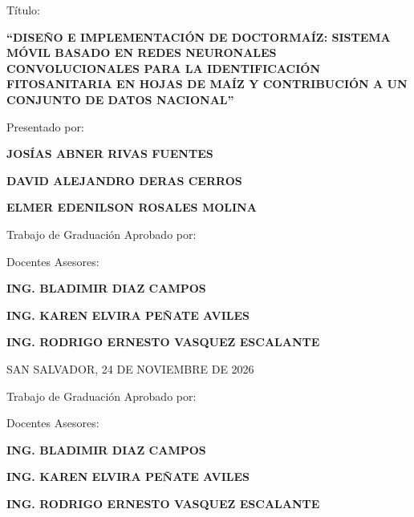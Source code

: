 \documentclass[12pt,letterpaper]{report}
\begin{document}
\noindent \small T\'itulo:
\begin{center}
{\normalsize\bfseries ``DISE\~NO E IMPLEMENTACI\'ON DE DOCTORMA\'IZ: SISTEMA M\'OVIL BASADO EN REDES NEURONALES CONVOLUCIONALES PARA LA IDENTIFICACI\'ON FITOSANITARIA EN HOJAS DE MA\'IZ Y CONTRIBUCI\'ON A UN CONJUNTO DE DATOS NACIONAL''\par}
\end{center}
\vspace{0.4cm}

\noindent \small Presentado por:
\begin{center}
{\normalsize\bfseries JOS\'IAS ABNER RIVAS FUENTES\par}
\vspace{0.15cm}
{\normalsize\bfseries DAVID ALEJANDRO DERAS CERROS\par}
\vspace{0.15cm}
{\normalsize\bfseries ELMER EDENILSON ROSALES MOLINA\par}
\end{center}
\vspace{0.4cm}

\noindent \small Trabajo de Graduaci\'on Aprobado por:\par
\vspace{0.25cm}
\noindent \small \hspace*{0.6cm} Docentes Asesores:
\begin{center}
{\normalsize\bfseries ING. BLADIMIR DIAZ CAMPOS\par}
\vspace{0.15cm}
{\normalsize\bfseries ING. KAREN ELVIRA PE\~NATE AVILES\par}
\vspace{0.15cm}
{\normalsize\bfseries ING. RODRIGO ERNESTO VASQUEZ ESCALANTE\par}
\end{center}
\vfill
\begin{center}
{\small SAN SALVADOR, 24 DE NOVIEMBRE DE 2026\par}
\end{center}

\newpage
\thispagestyle{empty}
\begin{center}
\vspace*{1.5cm}
{\normalsize Trabajo de Graduaci\'on Aprobado por:\par}
\end{center}
\vspace{2.5cm}

\noindent \small Docentes Asesores:
\begin{center}
{\normalsize\bfseries ING. BLADIMIR DIAZ CAMPOS\par}
\vspace{0.4cm}
{\normalsize\bfseries ING. KAREN ELVIRA PE\~NATE AVILES\par}
\vspace{0.4cm}
{\normalsize\bfseries ING. RODRIGO ERNESTO VASQUEZ ESCALANTE\par}
\end{center}
\end{document}
